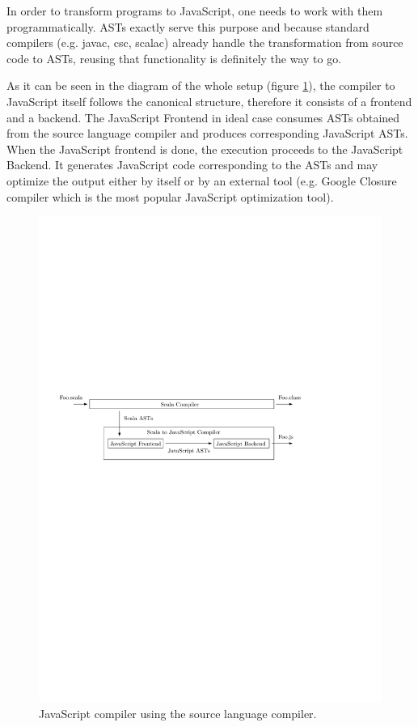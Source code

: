 \documentclass[12pt,a4paper]{report}
\begin{document}
In order to transform programs to JavaScript, one needs to work with them programmatically. ASTs exactly serve this purpose and because standard compilers (e.g. javac, csc, scalac) already handle the transformation from source code to ASTs, reusing that functionality is definitely the way to go.

As it can be seen in the diagram of the whole setup (figure \ref{CompilerPlugging}), the compiler to JavaScript itself follows the canonical structure, therefore it consists of a frontend and a backend. The JavaScript Frontend in ideal case consumes ASTs obtained from the source language compiler and produces corresponding JavaScript ASTs. When the JavaScript frontend is done, the execution proceeds to the JavaScript Backend. It generates JavaScript code corresponding to the ASTs and may optimize the output either by itself or by an external tool (e.g. Google Closure compiler \cite{GoogleClosure} which is the most popular JavaScript optimization tool).

\begin{figure}[ht]
  \centering
	\includegraphics[width=\linewidth,height=\textheight,keepaspectratio]{img/CompilerPlugging.pdf}
	\caption{JavaScript compiler using the source language compiler.}
	\label{CompilerPlugging}
\end{figure}
\end{document}
